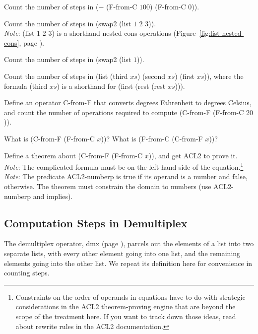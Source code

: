 \begin{ExerciseList}

\Exercise
Count the number of steps in \textsf{($-$ (F-from-C $100$) (F-from-C $0$))}.

\Exercise\label{ex:swap2-count}
Count the number of steps in \textsf{(swap2 (list $1$ $2$ $3$))}.\\
\emph{Note}: \textsf{(list $1$ $2$ $3$)} is a shorthand nested \textsf{cons} operations
(Figure~\ref{fig:list-nested-cons}, page \pageref{fig:list-nested-cons}).

\Exercise
Count the number of steps in \textsf{(swap2 (list $1$))}.

\Exercise
Count the number of steps in
\textsf{(list (third $xs$) (second $xs$) (first $xs$))},
where the formula \textsf{(third $xs$)} is a shorthand for
\textsf{(first (rest (rest $xs$)))}.

\Exercise
Define an operator \textsf{C-from-F} that converts degrees Fahrenheit
to degrees Celsius, and count the number of operations
required to compute \textsf{(C-from-F (F-from-C $20$))}.

\Exercise
What is \textsf{(C-from-F (F-from-C $x$))}?
What is \textsf{(F-from-C (C-from-F $x$))}?

\Exercise
Define a theorem about \textsf{(C-from-F (F-from-C $x$))},
and get ACL2 to prove it. \\
\emph{Note}: The complicated formula must be on the left-hand side of the
equation.\footnote{Constraints on the order of operands
in equations have to do with strategic considerations
in the ACL2 theorem-proving engine that are
beyond the scope of the treatment here. If you want to track
down those ideas, read about rewrite rules in the ACL2 documentation.}\\
\emph{Note}: The predicate \textsf{ACL2-numberp} is true
if its operand is a number and false, otherwise.
The theorem must constrain the domain to numbers
(use \textsf{ACL2-numberp} and \textsf{implies}).

\end{ExerciseList}

\subsection{Computation Steps in Demultiplex}
\label{subsec:dmx-steps}

The demultiplex operator, \textsf{dmx} (page \pageref{dmx-defun}),
parcels out the elements of a list
into two separate lists, with every other element going into one list,
and the remaining elements going into the other list.
We repeat its definition here for convenience in counting steps.


